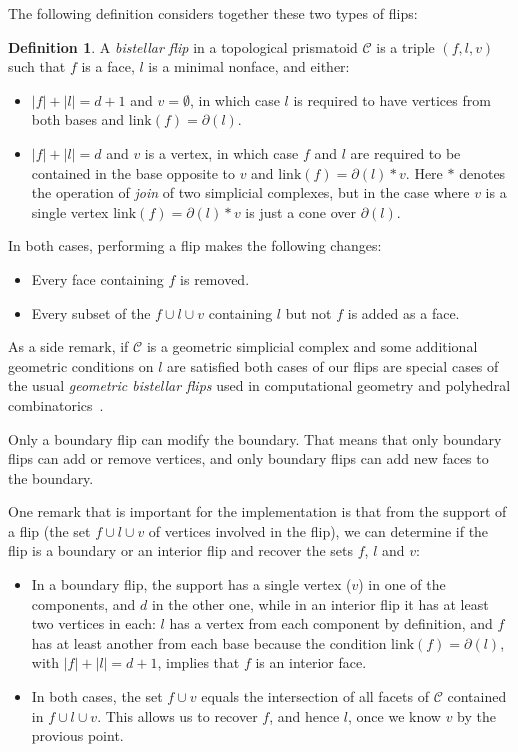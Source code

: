 \documentclass[12pt,a4paper]{article}
\theoremstyle{plain}
\theoremstyle{definition}
\newtheorem{definition}{Definition}
\begin{document}
The following definition considers together these two types of flips:

\begin{definition}
A \emph{bistellar flip} in a topological prismatoid $\mathcal{C}$ is a triple $(f,l,v)$ such that $f$ is a face, $l$ is a minimal nonface, and either:
\begin{itemize}
\item $|f|+|l|=d+1$ and $v=\emptyset$, in which case $l$ is required to have vertices from both bases and $\text{link}(f)=\partial(l)$.
\item $|f|+|l|=d$ and $v$ is a vertex, in which case $f$ and $l$ are required to be contained in the base opposite to $v$ and $\text{link}(f)=\partial(l)*v$. Here $*$ denotes the operation of \emph{join} of two simplicial complexes, but in the case where $v$ is a single vertex $\text{link}(f)=\partial(l)*v$ is just a cone over $\partial(l)$.
\end{itemize}
In both cases, performing a flip makes the following changes:
  \begin{itemize}
  \item Every face containing $f$ is removed.
  \item Every subset of the $f\cup l \cup v$ containing $l$ but not $f$ is added as a face.
\end{itemize}
\end{definition}

As a side remark, if $\mathcal{C}$ is a geometric simplicial complex and some additional geometric conditions on $l$ are satisfied both cases of our flips are special cases of the usual \emph{geometric bistellar flips} used in computational geometry and polyhedral combinatorics~\cite{SantosFlips}.

Only a boundary flip can modify the boundary. That means that only boundary flips can add or remove vertices, and only boundary flips can add new faces to the boundary. 

One remark that is important for the implementation is that from the support of a flip (the set $f\cup l \cup v$ of vertices involved in the flip), we can determine if the flip is a boundary or an interior flip and recover the sets $f$, $l$ and $v$:

\begin{itemize}
\item In a boundary flip, the support has a single vertex ($v$) in one of the components, and $d$ in the other one, while in an interior flip it has at least two vertices in each: $l$ has a vertex from each component by definition, and $f$ has at least another from each base because the condition $\text{link}(f)=\partial(l)$, with $|f|+|l|=d+1$, implies that $f$ is an interior face.

\item In both cases, the set $f\cup v$ equals the intersection of all facets of $\mathcal{C}$ contained in $f\cup l \cup v$. This allows us to recover $f$, and hence $l$, once we know $v$ by the provious point.
\end{itemize}
\end{document}
